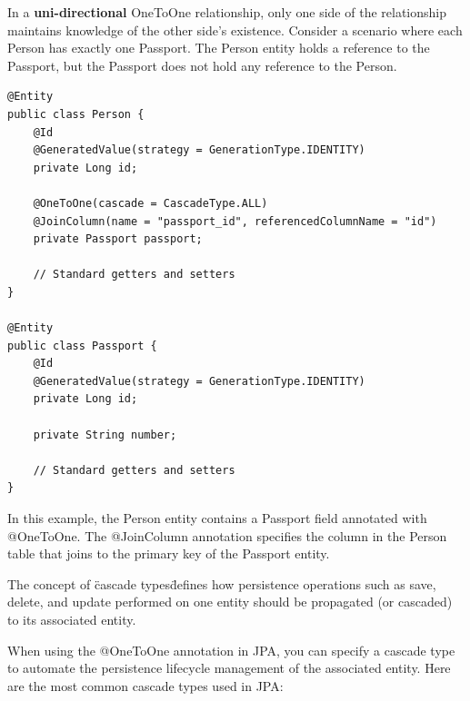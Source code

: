 In a \textbf{uni-directional} OneToOne relationship, only one side of the relationship maintains knowledge of the other side’s existence. Consider a scenario where each Person has exactly one Passport. The Person entity holds a reference to the Passport, but the Passport does not hold any reference to the Person.

\begin{lstlisting}
@Entity
public class Person {
    @Id
    @GeneratedValue(strategy = GenerationType.IDENTITY)
    private Long id;
    
    @OneToOne(cascade = CascadeType.ALL)
    @JoinColumn(name = "passport_id", referencedColumnName = "id")
    private Passport passport;

    // Standard getters and setters
}

@Entity
public class Passport {
    @Id
    @GeneratedValue(strategy = GenerationType.IDENTITY)
    private Long id;
    
    private String number;

    // Standard getters and setters
}
\end{lstlisting}

In this example, the Person entity contains a Passport field annotated with @OneToOne. The @JoinColumn annotation specifies the column in the Person table that joins to the primary key of the Passport entity.

The concept of \"cascade types\" defines how persistence operations such as save, delete, and update performed on one entity should be propagated (or cascaded) to its associated entity. 

When using the @OneToOne annotation in JPA, you can specify a cascade type to automate the persistence lifecycle management of the associated entity. Here are the most common cascade types used in JPA:

